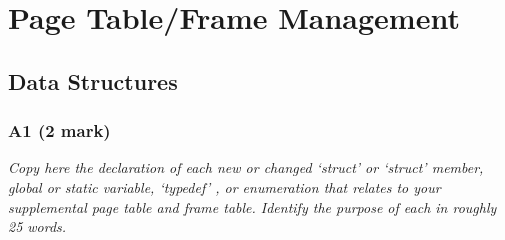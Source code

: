 \documentclass{report}
\newcommand{\question}[1]{\textit{#1} \ }
\begin{document}
	\section*{Page Table/Frame Management}
		\subsection*{Data Structures}
			\subsubsection*{A1 (2 mark)}
				\question{Copy here the declaration of each new or changed 
				`struct' or `struct' member, global or static variable, `typedef'
				, or enumeration that relates to your supplemental page table 
				and frame table. Identify the purpose of each in roughly 25 words.}
				
\end{document}
